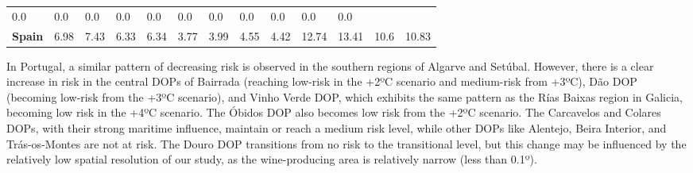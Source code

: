 \begin{table}[H]
{\begin{tabular}{lllllllllllll}
            0.0                                                &
            0.0                                                &
            0.0                                                &
            0.0                                                &
            0.0                                                &
            0.0                                                &
            0.0                                                &
            0.0                                                &
            0.0                                                &
            0.0                                                &
            0.0                                                  \\
            \textbf{Spain}                                     &
            6.98                                               &
            7.43                                               &
            6.33                                               &
            6.34                                               &
            3.77                                               &
            3.99                                               &
            4.55                                               &
            4.42                                               &
            12.74                                              &
            13.41                                              &
            10.6                                               &
            10.83                                                \\ \hline
        \end{tabular}%
    }
\end{table}

In Portugal, a similar pattern of decreasing risk is observed in the southern
regions of Algarve and Setúbal. However, there is a clear increase in risk in
the central DOPs of Bairrada (reaching low-risk in the +2ºC scenario and
medium-risk from +3ºC), Dão DOP (becoming low-risk from the +3ºC scenario), and
Vinho Verde DOP, which exhibits the same pattern as the Rías Baixas region in
Galicia, becoming low risk in the +4ºC scenario. The Óbidos DOP also becomes
low risk from the +2ºC scenario. The Carcavelos and Colares DOPs, with their
strong maritime influence, maintain or reach a medium risk level, while other
DOPs like Alentejo, Beira Interior, and Trás-os-Montes are not at risk. The
Douro DOP transitions from no risk to the transitional level, but this change
may be influenced by the relatively low spatial resolution of our study, as the
wine-producing area is relatively narrow (less than 0.1º).

